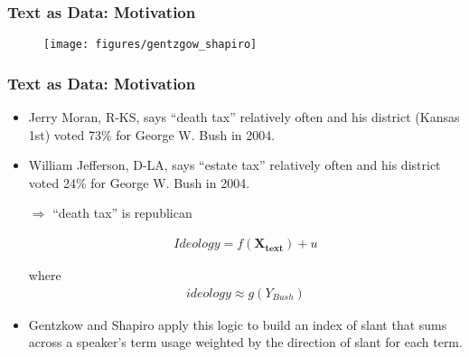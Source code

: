 \documentclass[
  shownotes,
  xcolor={svgnames},
  hyperref={colorlinks,citecolor=DarkBlue,linkcolor=DarkRed,urlcolor=DarkBlue}
  , aspectratio=169]{beamer}
\newcommand{\bm}[1]{\mathbf{#1}}
\begin{document}
\begin{frame}[fragile]
\frametitle{Text as Data: Motivation}


  \begin{figure}[H] \centering
            \captionsetup{justification=centering}
              \texttt{[image: figures/gentzgow\_shapiro]}
              
 \end{figure}

\end{frame}
\begin{frame}[fragile]
\frametitle{Text as Data: Motivation}

\begin{itemize} 
  \item Jerry Moran, R-KS, says ``death tax'' relatively often and his district (Kansas 1st) voted 73\% for George W. Bush in 2004.

  \item William Jefferson, D-LA, says ``estate tax'' relatively often and his district voted 24\% for George W. Bush in 2004.

\medskip

$\bm{\Rightarrow}$ ``death tax'' is republican



\begin{align}
Ideology = f(\bm{X_\text{text}}) + u
\end{align}

where 
\begin{align}
ideology \approx g(Y_{Bush})
\end{align}

\item Gentzkow and Shapiro apply this logic to build an index of slant that sums across a speaker’s term usage weighted by the direction of slant for each term. 

\end{itemize}


\end{frame}


\end{document}
